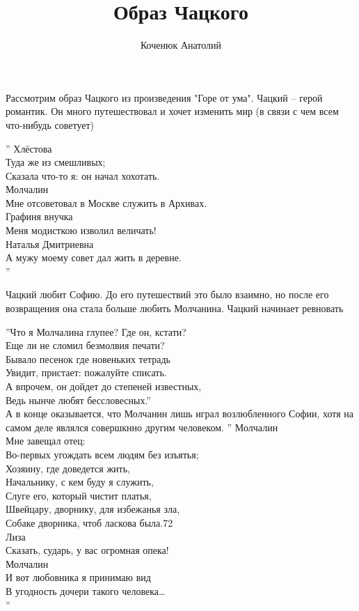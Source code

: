 \documentclass[12pt,a4paper]{article}
\author{Коченюк Анатолий}
\title{Образ Чацкого}
\begin{document}
\maketitle

Рассмотрим образ Чацкого  из произведения "Горе от ума". 
Чацкий -- герой романтик. Он много путешествовал и хочет изменить мир (в связи с чем всем что-нибудь советует)

''
Хлёстова\\
Туда же из смешливых;\\
Сказала что-то я: он начал хохотать.\\
Молчалин\\
Мне отсоветовал в Москве служить в Архивах.\\
Графиня внучка\\
Меня модисткою изволил величать!\\
Наталья Дмитриевна\\
А мужу моему совет дал жить в деревне.\\
''


Чацкий любит Софию. До его путешествий это было взаимно, но после его возвращения она стала больше любить Молчанина. Чацкий начинает ревновать 

''Что я Молчалина глупее? Где он, кстати?\\
Еще ли не сломил безмолвия печати?\\
Бывало песенок где новеньких тетрадь\\
Увидит, пристает: пожалуйте списать.\\
А впрочем, он дойдет до степеней известных,\\
Ведь нынче любят бессловесных.''
\\
А в конце оказывается, что Молчанин лишь играл возлюбленного Софии, хотя на самом деле являлся совершкнно другим человеком.
''
Молчалин\\
Мне завещал отец:\\
Во-первых угождать всем людям без изъятья;\\
Хозяину, где доведется жить,\\
Начальнику, с кем буду я служить,\\
Слуге его, который чистит платья,\\
Швейцару, дворнику, для избежанья зла,\\
Собаке дворника, чтоб ласкова была.72\\
Лиза\\
Сказать, сударь, у вас огромная опека!\\
Молчалин\\
И вот любовника я принимаю вид\\
В угодность дочери такого человека…\\
''
\\
\end{document}
